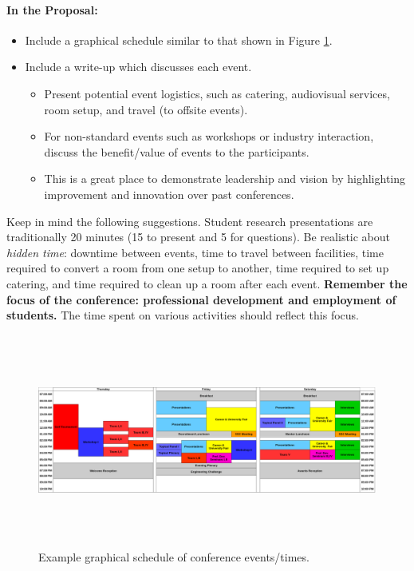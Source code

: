 \documentclass[12pt]{article}
\begin{document}
\paragraph{In the Proposal:}
\begin{itemize}
    \item{Include a graphical schedule similar to that shown in Figure \ref{fig:example_graphical_schedule}.}

    \item{Include a write-up which discusses each event.
    \begin{itemize}
        \item{Present potential event logistics, such as catering, audiovisual services, room setup, and travel (to offsite events).}
        \item{For non-standard events such as workshops or industry interaction, discuss the benefit/value of events to the participants.}
        \item{This is a great place to demonstrate leadership and vision by highlighting improvement and innovation over past conferences.}
    \end{itemize}}
\end{itemize}

Keep in mind the following suggestions. Student research presentations are traditionally 20 minutes (15 to present and 5
for questions). Be realistic about \textit{hidden time}: downtime between events, time to travel between facilities, time required to convert a room from one setup to another, time required to set up catering, and time required to clean up a room after each event. \textbf{Remember the focus of the conference: professional development and employment of students.} The time spent on various activities should reflect this focus.

\begin{figure}[h]
\centering
\includegraphics[width=17cm, height=7cm]{example_schedule.png}
\caption{Example graphical schedule of conference events/times.}
\label{fig:example_graphical_schedule}
\end{figure}
\end{document}
